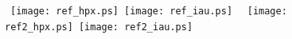 \documentclass{report}
\begin{document}
\thispagestyle{empty}
\vbox{
\vskip 8cm
\hbox{
\texttt{[image: ref\_hpx.ps]}
\hfill
\texttt{[image: ref\_iau.ps]}
}
\hbox{
\texttt{[image: ref2\_hpx.ps]}
\hfill
\texttt{[image: ref2\_iau.ps]}
}
}
\end{document}
